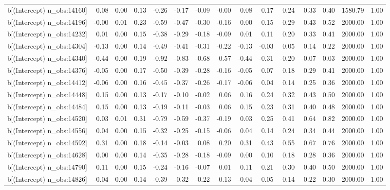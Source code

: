\begin{table}[ht]
\begin{tabular}{rrrrrrrrrrrrrrr}
  b[(Intercept) n\_obs:14160] & 0.08 & 0.00 & 0.13 & -0.26 & -0.17 & -0.09 & -0.00 & 0.08 & 0.17 & 0.24 & 0.33 & 0.40 & 1580.79 & 1.00 \\ 
  b[(Intercept) n\_obs:14196] & -0.00 & 0.01 & 0.23 & -0.59 & -0.47 & -0.30 & -0.16 & 0.00 & 0.15 & 0.29 & 0.43 & 0.52 & 2000.00 & 1.00 \\ 
  b[(Intercept) n\_obs:14232] & 0.01 & 0.00 & 0.15 & -0.38 & -0.29 & -0.18 & -0.09 & 0.01 & 0.11 & 0.20 & 0.33 & 0.41 & 2000.00 & 1.00 \\ 
  b[(Intercept) n\_obs:14304] & -0.13 & 0.00 & 0.14 & -0.49 & -0.41 & -0.31 & -0.22 & -0.13 & -0.03 & 0.05 & 0.14 & 0.22 & 2000.00 & 1.00 \\ 
  b[(Intercept) n\_obs:14340] & -0.44 & 0.00 & 0.19 & -0.92 & -0.83 & -0.68 & -0.57 & -0.44 & -0.31 & -0.20 & -0.07 & 0.03 & 2000.00 & 1.00 \\ 
  b[(Intercept) n\_obs:14376] & -0.05 & 0.00 & 0.17 & -0.50 & -0.39 & -0.28 & -0.16 & -0.05 & 0.07 & 0.18 & 0.29 & 0.41 & 2000.00 & 1.00 \\ 
  b[(Intercept) n\_obs:14412] & -0.06 & 0.00 & 0.16 & -0.45 & -0.37 & -0.26 & -0.17 & -0.06 & 0.04 & 0.14 & 0.25 & 0.36 & 2000.00 & 1.00 \\ 
  b[(Intercept) n\_obs:14448] & 0.15 & 0.00 & 0.13 & -0.17 & -0.10 & -0.02 & 0.06 & 0.16 & 0.24 & 0.32 & 0.43 & 0.50 & 2000.00 & 1.00 \\ 
  b[(Intercept) n\_obs:14484] & 0.15 & 0.00 & 0.13 & -0.19 & -0.11 & -0.03 & 0.06 & 0.15 & 0.23 & 0.31 & 0.40 & 0.48 & 2000.00 & 1.00 \\ 
  b[(Intercept) n\_obs:14520] & 0.03 & 0.01 & 0.31 & -0.79 & -0.59 & -0.37 & -0.19 & 0.03 & 0.25 & 0.41 & 0.64 & 0.82 & 2000.00 & 1.00 \\ 
  b[(Intercept) n\_obs:14556] & 0.04 & 0.00 & 0.15 & -0.32 & -0.25 & -0.15 & -0.06 & 0.04 & 0.14 & 0.24 & 0.34 & 0.44 & 2000.00 & 1.00 \\ 
  b[(Intercept) n\_obs:14592] & 0.31 & 0.00 & 0.18 & -0.14 & -0.03 & 0.08 & 0.20 & 0.31 & 0.43 & 0.55 & 0.67 & 0.76 & 2000.00 & 1.00 \\ 
  b[(Intercept) n\_obs:14628] & 0.00 & 0.00 & 0.14 & -0.35 & -0.28 & -0.18 & -0.09 & 0.00 & 0.10 & 0.18 & 0.28 & 0.36 & 2000.00 & 1.00 \\ 
  b[(Intercept) n\_obs:14790] & 0.11 & 0.00 & 0.15 & -0.24 & -0.16 & -0.07 & 0.01 & 0.11 & 0.21 & 0.30 & 0.40 & 0.50 & 2000.00 & 1.00 \\ 
  b[(Intercept) n\_obs:14826] & -0.04 & 0.00 & 0.14 & -0.39 & -0.32 & -0.22 & -0.13 & -0.04 & 0.05 & 0.14 & 0.22 & 0.30 & 2000.00 & 1.00 \\ 

\end{tabular}
\end{table}
